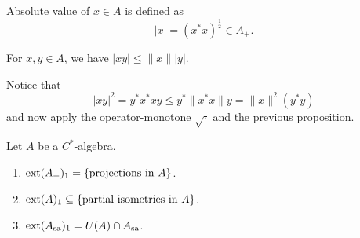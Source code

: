 \begin{definition}
  Absolute value of $x \in A$ is defined as $$|x| = (x^* x)^{\frac{1}{2}} \in A_+.$$
\end{definition}

\begin{corollary}
  For $x, y \in A$, we have $|xy| \leq \|x\| |y|.$
\end{corollary}

\begin{myproof}
  Notice that 
  $$|xy|^2 = y^* x^* x y \leq y^* \|x^* x\| y = \|x\|^2 (y^* y)$$
  and now apply the operator-monotone $\sqrt{\cdot}$ and the previous proposition.
\end{myproof}

\begin{theorem}
  Let $A$ be a $C^*$-algebra. 
  \begin{enumerate}
    \item $\operatorname{ext} (A_+)_1 = \{\textrm{projections in $A$}\}$.
    \item $\operatorname{ext} (A)_1 \subseteq \{\textrm{partial isometries in $A$}\}$.
    \item $\operatorname{ext} (A_{\operatorname{sa}})_1 = U(A) \cap A_{\operatorname{sa}}$.
  \end{enumerate}
\end{theorem}

